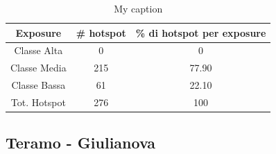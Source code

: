 \begin{table}[H]
	\centering
	\caption{My caption}
	\label{risultati_roma_pescara}
	\begin{tabular}{|c|c|c|}
		\hline
		\rowcolor[HTML]{C0C0C0} 
		\textbf{Exposure} & \textbf{\# hotspot} & \textbf{\% di hotspot per exposure} \\ \hline
		Classe Alta       & 0                  & 0                                   \\ \hline
		Classe Media      & 215                 & 77.90                             \\ \hline
		Classe Bassa      & 61               & 22.10                               \\ \hline
		Tot. Hotspot      & 276                & 100                                 \\ \hline
	\end{tabular}
\end{table}

\subsection{Teramo - Giulianova}

